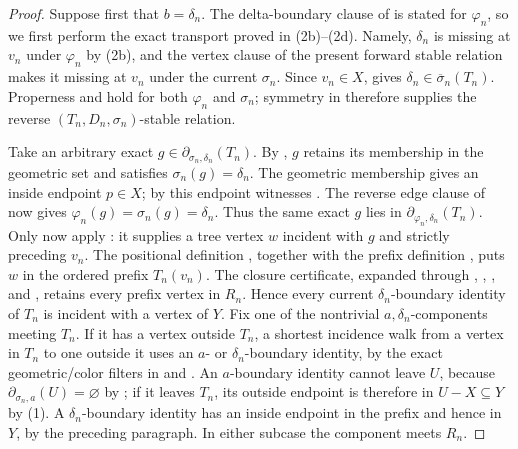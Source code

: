 \begin{proof}
Suppose first that $b=\delta_n$.  The delta-boundary clause of
 is stated for $\varphi_n$, so we
first perform the exact transport proved in (2b)--(2d).  Namely,
$\delta_n$ is missing at $v_n$ under $\varphi_n$ by (2b), and the vertex
clause of the present forward stable relation makes it missing at $v_n$
under the current $\sigma_n$.  Since $v_n\in X$,
 gives
$\delta_n\in\overline\sigma_n(T_n)$.  Properness and
 hold for both $\varphi_n$ and $\sigma_n$;
symmetry in  therefore supplies the reverse
$(T_n,D_n,\sigma_n)$-stable relation.

Take an arbitrary exact
$g\in\partial_{\sigma_n,\delta_n}(T_n)$.  By
, $g$ retains its membership in the geometric
set  and satisfies $\sigma_n(g)=\delta_n$.
The geometric membership gives an inside endpoint $p\in X$; by
 this endpoint witnesses
.  The reverse edge clause of
 now gives
$\varphi_n(g)=\sigma_n(g)=\delta_n$.  Thus the same exact $g$ lies in
$\partial_{\varphi_n,\delta_n}(T_n)$.  Only now apply
: it supplies a tree vertex $w$
incident with $g$ and strictly preceding $v_n$.  The positional definition
, together with the prefix definition
, puts $w$ in the ordered prefix $T_n(v_n)$.
The  closure certificate, expanded through
, ,
, and
, retains every prefix vertex in
$R_n$.  Hence every current $\delta_n$-boundary identity of $T_n$ is
incident with a vertex of $Y$.
Fix one of the nontrivial $a,\delta_n$-components meeting $T_n$.  If it
has a vertex outside $T_n$, a shortest incidence walk from a vertex in
$T_n$ to one outside it uses an $a$- or $\delta_n$-boundary identity, by
the exact geometric/color filters in  and
.
An $a$-boundary identity cannot leave $U$, because
$\partial_{\sigma_n,a}(U)=\varnothing$ by
;
if it leaves $T_n$, its outside endpoint is therefore in $U-X\subseteq
Y$ by (1).  A $\delta_n$-boundary identity has an inside endpoint in the
prefix and hence in $Y$, by the preceding paragraph.  In either subcase
the component meets $R_n$.


\end{proof}
